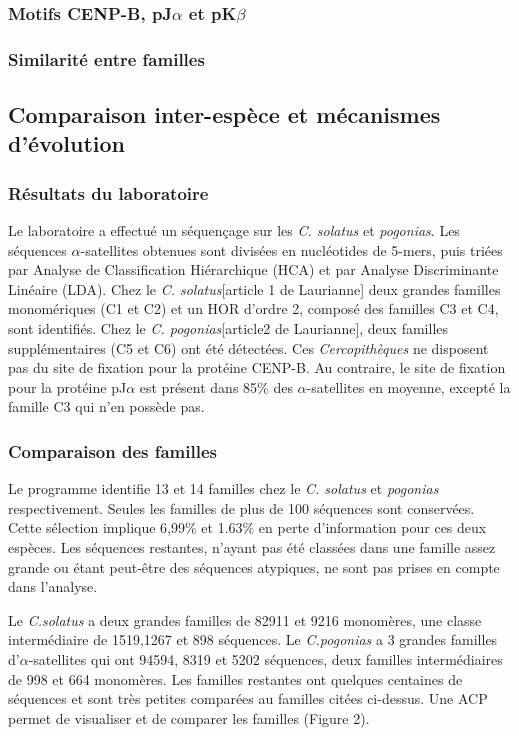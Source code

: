 \documentclass[12pt,a4paper]{article}
\begin{document}
			\subsubsection{Motifs CENP-B, pJ$\alpha$ et pK$\beta$}
			\subsubsection{Similarité entre familles}
	
	\subsection{Comparaison inter-espèce et mécanismes d'évolution}
		\subsubsection{Résultats du laboratoire}
		Le laboratoire a effectué un séquençage sur les \textit{C. solatus} et \textit{pogonias}. Les séquences $\alpha$-satellites obtenues sont divisées en nucléotides de 5-mers, puis triées par Analyse de Classification Hiérarchique (HCA) et par Analyse Discriminante Linéaire (LDA). Chez le \textit{C. solatus}[article 1 de Laurianne] deux grandes familles monomériques (C1 et C2) et un HOR d'ordre 2, composé des familles C3 et C4, sont identifiés. Chez le \textit{C. pogonias}[article2 de Laurianne], deux familles supplémentaires (C5 et C6) ont été détectées. Ces \textit{Cercopithèques} ne disposent pas du site de fixation pour la protéine CENP-B. Au contraire, le site de fixation pour la protéine pJ$\alpha$ est présent dans 85\% des $\alpha$-satellites en moyenne, excepté la famille C3 qui n'en possède pas.  
		\subsubsection{Comparaison des familles}
		
Le programme identifie 13 et 14 familles chez le \textit{C. solatus} et \textit{pogonias} respectivement. Seules les familles de plus de 100 séquences sont conservées. Cette sélection implique 6,99\% et 1.63\% en perte d'information pour ces deux espèces. Les séquences restantes, n'ayant pas été classées dans une famille assez grande ou étant peut-être des séquences atypiques, ne sont pas prises en compte dans l'analyse. 

Le \textit{C.solatus} a deux grandes familles de 82911 et 9216 monomères, une classe intermédiaire de 1519,1267 et 898 séquences. Le \textit{C.pogonias} a 3 grandes familles d'$\alpha$-satellites qui ont 94594, 8319 et 5202 séquences, deux familles intermédiaires de 998 et 664 monomères. Les familles restantes ont quelques centaines de séquences et sont très petites comparées au familles citées ci-dessus. Une ACP permet de visualiser et de comparer les familles (Figure 2). 
\end{document}
